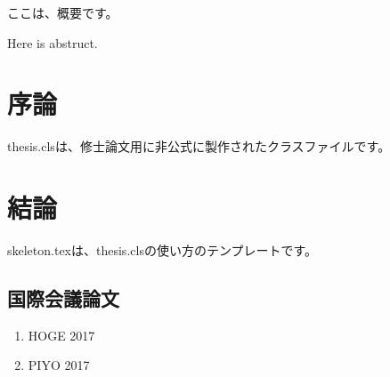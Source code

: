 \documentclass{thesis}
\begin{document}
\begin{jabst} %
    ここは、概要です。
\end{jabst}
\begin{eabst} %
    Here is abstruct.
\end{eabst}
\frontmatter
\tableofcontents %
\listoffigures %
\listoftables %

\mainmatter %
\chapter{序論}
thesis.clsは、修士論文用に非公式に製作されたクラスファイルです。

\chapter{結論}
skeleton.texは、thesis.clsの使い方のテンプレートです。

\begin{thebibliography}{} %
\end{thebibliography}
%

\newpage
\section*{国際会議論文}
\begin{enumerate}[{1)}]
    \item HOGE 2017
    \item PIYO 2017
\end{enumerate}

\appendix %
\end{document}
